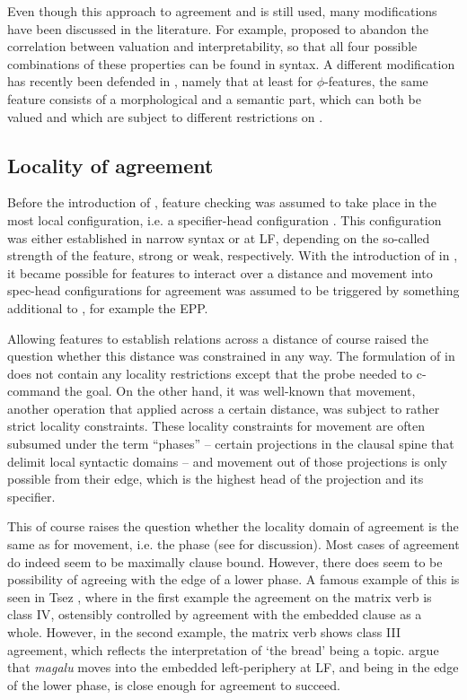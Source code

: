 \documentclass[output=paper
,modfonts
,nonflat]{langsci/langscibook}
\begin{document}
Even though this approach  to agreement and \agr{} is still used, many modifications have been discussed in the literature. For example, \citet{pesetskytorrego2007} proposed to abandon the correlation between valuation and interpretability, so that all four possible combinations of these properties can be found in syntax.
A different modification has recently been defended in \citet{smithdiss,smithsse}, namely that at least for $\phi$-fea\-tures, the same feature consists of a morphological and a semantic part, which can both be valued and which are subject to different restrictions on \agr.


\subsection{Locality of agreement}
\label{sec:locality}

Before the introduction of \agr, feature checking was assumed to take place in the most local configuration, i.e. a specifier-head configuration \citep{Chomsky1995}. This configuration was either established in narrow syntax or at LF, depending on the so-called strength of the feature, strong or weak, respectively. With the introduction of \agr{} in \citet{Chomsky2000,Chomsky2001}, it became possible for features to interact over a distance and movement into spec-head configurations for agreement was assumed to be triggered by something additional to \agr, for example the EPP.

Allowing features to establish relations across a distance of course raised the question whether this distance was constrained in any way. The formulation of \agr{} in \citet{Chomsky2000,Chomsky2001} does not contain any locality restrictions except that the probe needed to c-command the goal. On the other hand, it was well-known that movement, another operation that applied across a certain distance, was subject to rather strict locality constraints.
These locality constraints for movement are often subsumed under the term ``phases'' -- certain projections in the clausal spine that delimit local syntactic domains -- and movement out of those projections is only possible from their edge, which is the highest head of the projection and its specifier.

This of course raises the question whether the locality domain of agreement is the same as for movement, i.e. the phase (see \citealp{bobaljikwurmbrand2005} for discussion).
Most cases of agreement do indeed seem to be maximally clause bound.
However, there does seem to be possibility of agreeing with the edge of a lower phase.
A famous example of this is seen in Tsez \citep{polinskypotsdam2001}, where in the first example the agreement on the matrix verb is class \textsc{IV}, ostensibly controlled by agreement with the embedded clause as a whole.
However, in the second example, the matrix verb shows class \textsc{III} agreement, which reflects the interpretation of `the bread' being a topic.
\citet{polinskypotsdam2001} argue that \textit{magalu} moves into the embedded left-periphery at LF, and being in the edge of the lower phase, is close enough for agreement to succeed.
\end{document}
